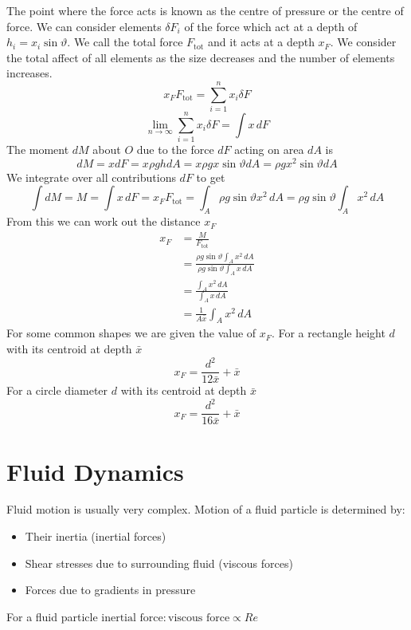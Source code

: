\documentclass{article}
\begin{document}
    The point where the force acts is known as the centre of pressure or the centre of force.
    We can consider elements \(\delta F_i\) of the force which act at a depth of \(h_i = x_i\sin\vartheta\).
    We call the total force \(F_\text{tot}\) and it acts at a depth \(x_F\).
    We consider the total affect of all elements as the size decreases and the number of elements increases.
    \[x_F F_\text{tot} = \sum_{i = 1}^{n}x_i\delta F\]
    \[\lim_{n\to\infty}\sum_{i = 1}^{n}x_i\delta F = \int x\,dF\]
    The moment \(dM\) about \(O\) due to the force \(dF\) acting on area \(dA\) is
    \[dM = xdF = x\rho g h dA = x\rho g x\sin\vartheta dA = \rho gx^2\sin\vartheta dA\]
    We integrate over all contributions \(dF\) to get
    \[\int dM = M = \int x\,dF = x_F F_\text{tot} = \int_A \rho g\sin\vartheta x^2\,dA = \rho g\sin\vartheta\int_A x^2\,dA\]
    From this we can work out the distance \(x_F\)
    \begin{align*}
        x_F &=\frac{M}{F_\text{tot}}\\
        &= \frac{\rho g\sin\vartheta\int_Ax^2\,dA}{\rho g\sin\vartheta\int_Ax\,dA}\\
        &= \frac{\int_A x^2\,dA}{\int_A x\,dA}\\
        &= \frac{1}{A\bar x}\int_A x^2\,dA
    \end{align*}
    For some common shapes we are given the value of \(x_F\).
    For a rectangle height \(d\) with its centroid at depth \(\bar x\)
    \[x_F = \frac{d^2}{12\bar x} + \bar x\]
    For a circle diameter \(d\) with its centroid at depth \(\bar x\)
    \[x_F = \frac{d^2}{16\bar x} + \bar x\]
    
    \section{Fluid Dynamics}
    Fluid motion is usually very complex.
    Motion of a fluid particle is determined by:
    \begin{itemize}
        \item Their inertia (inertial forces)
        \item Shear stresses due to surrounding fluid (viscous forces)
        \item Forces due to gradients in pressure
    \end{itemize}
    For a fluid particle \(\text{inertial force}:\text{viscous force} \propto Re\)
    
\end{document}
